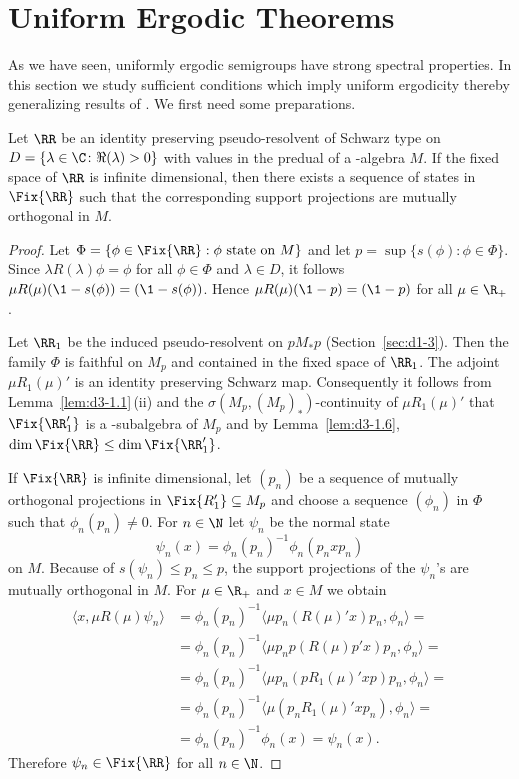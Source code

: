 \section{Uniform Ergodic Theorems}\label{sec:d4-4}
As we have seen, uniformly ergodic semigroups have strong spectral properties.
In this section we study sufficient conditions which imply uniform ergodicity thereby generalizing results of 
\textcite{groh:1984b}.
We first need some preparations.
\begin{lemma}\label{lem:d4-4.1}
Let $ \RR $  be an identity preserving pseudo-resolvent of Schwarz type on $ D = \{\lambda \in \C \colon  \Re(\lambda) > 0\} $  with values in the predual of a \WA-algebra $ M $.
If the fixed space of\/ $ \RR $  is infinite dimensional, then there exists a sequence of states in $ \Fix{\RR} $  such that the corresponding support projections are mutually orthogonal in $ M $.
\end{lemma}
\begin{proof}
Let $ \Phi = \{\phi \in \Fix{\RR}: \phi \text{ state on $ M $}\} $  and let $ p = \sup\{s(\phi): \phi \in \Phi\} $.
Since $ \lambda R(\lambda)\phi = \phi $  for all $ \phi \in \Phi $  and $ \lambda \in D $,  it follows $ \mu R(\mu)(\1 - s(\phi)) = (\1 - s(\phi)) $.
Hence $ \mu R(\mu)(\1 - p) = (\1 -p ) $  for all $ \mu \in \R_{+} $.

Let $ \RR_{1} $  be the induced pseudo-resolvent on $ pM_{*}p $  (Section~\ref{sec:d1-3}).
Then the family $ \Phi $  is faithful on $ M_{p} $  and contained in the fixed space of\/ $ \RR_{1} $.
The adjoint $ \mu R_{1}(\mu)' $  is an identity preserving Schwarz map.
Consequently it follows from Lemma~\ref{lem:d3-1.1}\,(ii) and the $ \sigma(M_{p},(M_{p})_{*}) $-continuity of\/ $ \mu R_{1}(\mu)' $  that $ \Fix{\RR_{1}'} $  is a \WA-subalgebra of\/ $ M_{p} $  and 
by Lemma~\ref{lem:d3-1.6}, $ \dim \Fix{\RR} \leq \dim \Fix{\RR_{1}'} $.

If\/ $ \Fix{\RR} $  is infinite dimensional, let $ (p_{n}) $  be a sequence of mutually orthogonal projections in 
$ \Fix{ R_{1}' } \subseteq M_{p} $  and choose a sequence $ (\phi_{n}) $  in $ \Phi $  such that $ \phi_{n}(p_{n}) \neq 0 $.
For $ n \in \N $  let $ \psi_{n} $  be the normal state
\[
\psi_{n}(x) = \phi_{n}(p_{n})^{-1}\phi_{n}(p_{n}xp_{n})
\]
on $ M $.
Because of\/ $ s(\psi_{n}) \leq p_{n} \leq p $, the support projections of the $ \psi_{n} $'s are mutually orthogonal in $ M $.
For $ \mu \in \R_{+} $  and $ x \in M $  we obtain
\[
\begin{aligned}
\langle x,\mu R(\mu)\psi_{n}\rangle &= \phi_{n}(p_{n})^{-1}\langle\mu p_{n}(R(\mu)'x)p_{n},\phi_{n}\rangle = \\
&= \phi_{n}(p_{n})^{-1}\langle\mu p_{n}p(R(\mu)p'x)p_{n},\phi_{n}\rangle = \\
&= \phi_{n}(p_{n})^{-1}\langle\mu p_{n}(pR_{1}(\mu)'xp)p_{n},\phi_{n}\rangle = \\
&= \phi_{n}(p_{n})^{-1}\langle\mu(p_{n}R_{1}(\mu)'xp_{n}),\phi_{n}\rangle = \\
&= \phi_{n}(p_{n})^{-1}\phi_{n}(x) = \psi_{n}(x).
\end{aligned}
\]
Therefore $ \psi_{n} \in \Fix{\RR} $  for all $ n \in \N $.
\end{proof}
